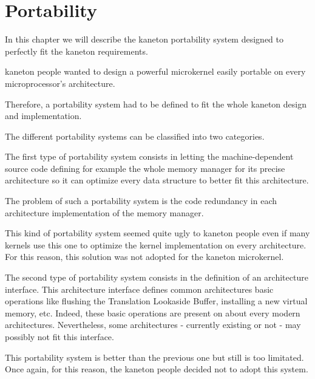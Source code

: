 
%
%

\chapter{Portability}

In this chapter we will describe the kaneton portability system designed
to perfectly fit the kaneton requirements.

\newpage

%
%

kaneton people wanted to design a powerful microkernel easily portable
on every microprocessor's architecture.

Therefore, a portability system had to be defined to fit the whole kaneton
design and implementation.

The different portability systems can be classified into two categories.

The first type of portability system consists in letting the
machine-dependent source code defining for example the whole memory manager
for its precise architecture so it can optimize every data structure to
better fit this architecture.

The problem of such a portability system is the code redundancy in each
architecture implementation of the memory manager.

This kind of portability system seemed quite ugly to kaneton people
even if many kernels use this one to optimize the kernel implementation
on every architecture. For this reason, this solution was not adopted
for the kaneton microkernel.

The second type of portability system consists in the definition of
an architecture interface. This architecture interface defines common
architectures basic operations like flushing the Translation Lookaside Buffer,
installing a new virtual memory, etc. Indeed, these basic operations
are present on about every modern architectures. Nevertheless, some
architectures - currently existing or not - may possibly not fit this
interface.

This portability system is better than the previous one but still is too
limitated. Once again, for this reason, the kaneton people decided not
to adopt this system.

